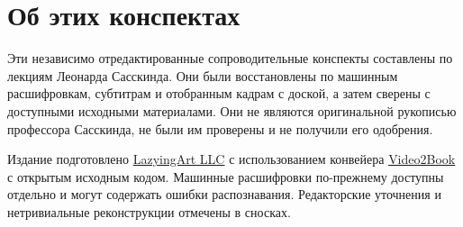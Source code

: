 \documentclass[11pt,oneside]{book}
\begin{document}
\frontmatter
\hypersetup{pageanchor=false}

\hypersetup{pageanchor=true}

\clearpage
\chapter*{Об этих конспектах}
Эти независимо отредактированные сопроводительные конспекты составлены по лекциям Леонарда Сасскинда. Они были восстановлены по машинным расшифровкам, субтитрам и отобранным кадрам с доской, а затем сверены с доступными исходными материалами. Они не являются оригинальной рукописью профессора Сасскинда, не были им проверены и не получили его одобрения.

Издание подготовлено \href{https://lazying.art}{LazyingArt LLC} с использованием конвейера \href{https://github.com/lachlanchen/Video2Book}{Video2Book} с открытым исходным кодом. Машинные расшифровки по-прежнему доступны отдельно и могут содержать ошибки распознавания. Редакторские уточнения и нетривиальные реконструкции отмечены в сносках.
\clearpage
\tableofcontents
\mainmatter










\end{document}
